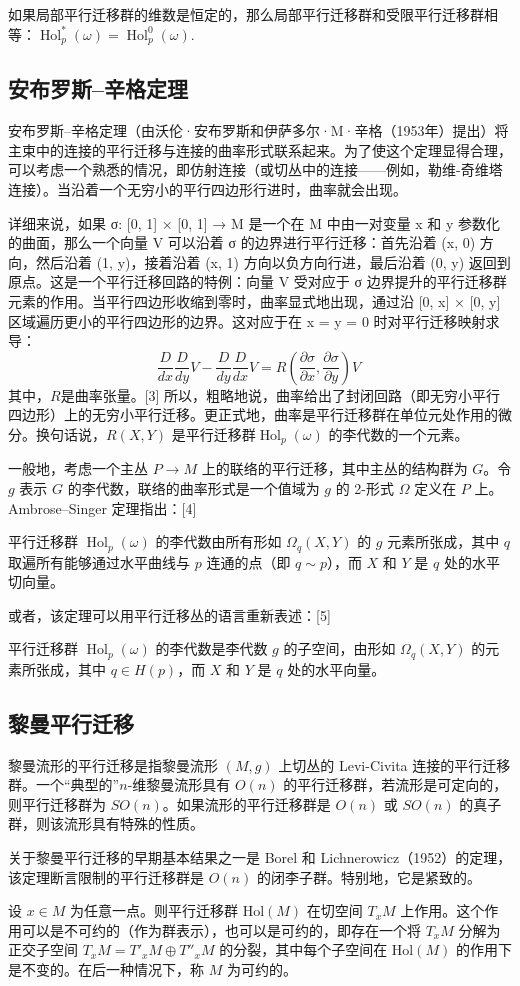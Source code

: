如果局部平行迁移群的维数是恒定的，那么局部平行迁移群和受限平行迁移群相等：\(\operatorname{Hol}_p^*(\omega) = \operatorname{Hol}_p^0(\omega)\).
\subsection{安布罗斯–辛格定理}  
安布罗斯–辛格定理（由沃伦·安布罗斯和伊萨多尔·M·辛格（1953年）提出）将主束中的连接的平行迁移与连接的曲率形式联系起来。为了使这个定理显得合理，可以考虑一个熟悉的情况，即仿射连接（或切丛中的连接——例如，勒维-奇维塔连接）。当沿着一个无穷小的平行四边形行进时，曲率就会出现。

详细来说，如果 σ: [0, 1] × [0, 1] → M 是一个在 M 中由一对变量 x 和 y 参数化的曲面，那么一个向量 V 可以沿着 σ 的边界进行平行迁移：首先沿着 (x, 0) 方向，然后沿着 (1, y)，接着沿着 (x, 1) 方向以负方向行进，最后沿着 (0, y) 返回到原点。这是一个平行迁移回路的特例：向量 V 受对应于 σ 边界提升的平行迁移群元素的作用。当平行四边形收缩到零时，曲率显式地出现，通过沿 [0, x] × [0, y] 区域遍历更小的平行四边形的边界。这对应于在 x = y = 0 时对平行迁移映射求导：
\[
\frac{D}{dx} \frac{D}{dy} V - \frac{D}{dy} \frac{D}{dx} V = R\left(\frac{\partial \sigma}{\partial x}, \frac{\partial \sigma}{\partial y}\right) V~
\]
其中，\(R\)是曲率张量。[3] 所以，粗略地说，曲率给出了封闭回路（即无穷小平行四边形）上的无穷小平行迁移。更正式地，曲率是平行迁移群在单位元处作用的微分。换句话说，\(R(X, Y)\) 是平行迁移群\(\operatorname{Hol}_p(\omega)\) 的李代数的一个元素。

一般地，考虑一个主丛 \( P \to M \) 上的联络的平行迁移，其中主丛的结构群为 \( G \)。令 \( g \) 表示 \( G \) 的李代数，联络的曲率形式是一个值域为 \( g \) 的 2-形式 \( \Omega \) 定义在 \( P \) 上。Ambrose–Singer 定理指出：[4]

平行迁移群 \( \operatorname{Hol}_p(\omega) \) 的李代数由所有形如 \( \Omega_q(X, Y) \) 的 \( g \) 元素所张成，其中 \( q \) 取遍所有能够通过水平曲线与 \( p \) 连通的点（即 \( q \sim p \)），而 \( X \) 和 \( Y \) 是 \( q \) 处的水平切向量。

或者，该定理可以用平行迁移丛的语言重新表述：[5]

平行迁移群 \( \operatorname{Hol}_p(\omega) \) 的李代数是李代数 \( g \) 的子空间，由形如 \( \Omega_q(X, Y) \) 的元素所张成，其中 \( q \in H(p) \)，而 \( X \) 和 \( Y \) 是 \( q \) 处的水平向量。
\subsection{黎曼平行迁移}
黎曼流形的平行迁移是指黎曼流形 \((M, g)\) 上切丛的 Levi-Civita 连接的平行迁移群。一个“典型的”\(n\)-维黎曼流形具有 \(O(n)\) 的平行迁移群，若流形是可定向的，则平行迁移群为 \(SO(n)\)。如果流形的平行迁移群是 \(O(n)\) 或 \(SO(n)\) 的真子群，则该流形具有特殊的性质。

关于黎曼平行迁移的早期基本结果之一是 Borel 和 Lichnerowicz（1952）的定理，该定理断言限制的平行迁移群是 \(O(n)\) 的闭李子群。特别地，它是紧致的。

设 \( x \in M \) 为任意一点。则平行迁移群 \( \text{Hol}(M) \) 在切空间 \( T_xM \) 上作用。这个作用可以是不可约的（作为群表示），也可以是可约的，即存在一个将 \( T_xM \) 分解为正交子空间 \( T_xM = T'_xM \oplus T''_xM \) 的分裂，其中每个子空间在 \( \text{Hol}(M) \) 的作用下是不变的。在后一种情况下，称 \( M \) 为可约的。